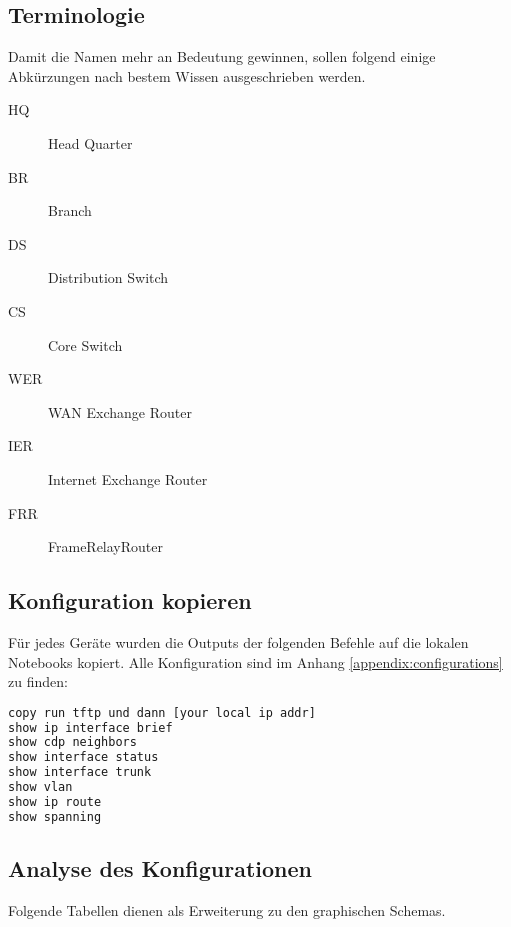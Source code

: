 \subsection{Terminologie}
Damit die Namen mehr an Bedeutung gewinnen, sollen folgend einige Abkürzungen nach bestem Wissen ausgeschrieben werden.
\begin{multicols}{2}
\begin{description}
	\item[HQ] Head Quarter
	\item[BR] Branch
	\item[DS] Distribution Switch
	\item[CS] Core Switch
	\item[WER] WAN Exchange Router
	\item[IER] Internet Exchange Router
	\item[FRR] FrameRelayRouter
\end{description}
\end{multicols}

\subsection{Konfiguration kopieren}
Für jedes Geräte wurden die Outputs der folgenden Befehle auf die lokalen Notebooks kopiert. Alle Konfiguration sind im Anhang \ref{appendix:configurations} zu finden:
\begin{lstlisting}[language=bash]
copy run tftp und dann [your local ip addr]
show ip interface brief
show cdp neighbors
show interface status
show interface trunk
show vlan
show ip route
show spanning
\end{lstlisting}

\subsection{Analyse des Konfigurationen}
Folgende Tabellen dienen als Erweiterung zu den graphischen Schemas.
